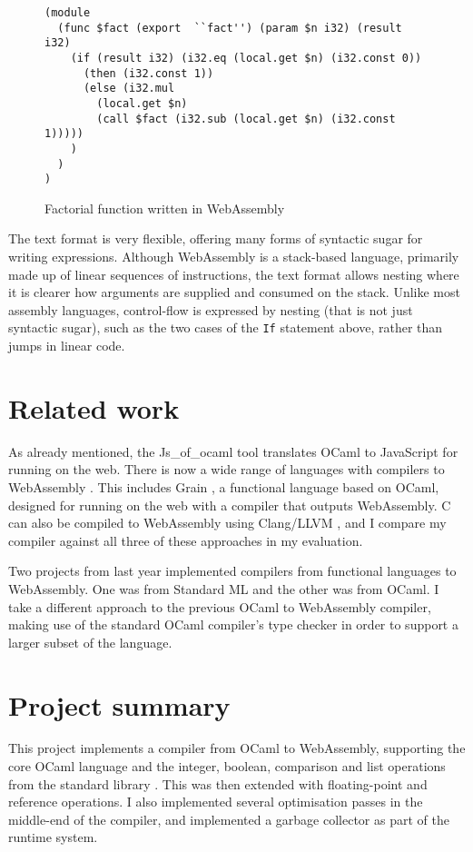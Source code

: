 \begin{figure}[H]
\begin{verbatim}
(module
  (func $fact (export  ``fact'') (param $n i32) (result i32)
    (if (result i32) (i32.eq (local.get $n) (i32.const 0))
      (then (i32.const 1))
      (else (i32.mul 
        (local.get $n) 
        (call $fact (i32.sub (local.get $n) (i32.const 1)))))
    )
  )
)
\end{verbatim}
\caption{Factorial function written in WebAssembly} 
\label{fig:wasm}
\end{figure}

The text format is very flexible, offering many forms of syntactic sugar for writing expressions. Although WebAssembly is a stack-based language, primarily made up of linear sequences of instructions, the text format allows nesting where it is clearer how arguments are supplied and consumed on the stack. Unlike most assembly languages, control-flow is expressed by nesting (that is not just syntactic sugar), such as the two cases of the \verb|If| statement above, rather than jumps in linear code.

\section{Related work}
As already mentioned, the Js\_of\_ocaml tool translates OCaml to JavaScript for running on the web. There is now a wide range of languages with compilers to WebAssembly \cite{langauges-to-wasm}. This includes Grain \cite{grain}, a functional language based on OCaml, designed for running on the web with a compiler that outputs WebAssembly. C can also be compiled to WebAssembly using Clang/LLVM \cite{clang-llvm}, and I compare my compiler against all three of these approaches in my evaluation.

Two projects from last year implemented compilers from functional languages to WebAssembly. One was from Standard ML and the other was from OCaml. I take a different approach to the previous OCaml to WebAssembly compiler, making use of the standard OCaml compiler's type checker in order to support a larger subset of the language.


\section{Project summary}
This project implements a compiler from OCaml to WebAssembly, supporting the core OCaml language and the integer, boolean, comparison and list operations from the standard library \cite{stdlib}. This was then extended with floating-point and reference operations.  I also implemented several optimisation passes in the middle-end of the compiler, and implemented a garbage collector as part of the runtime system.








